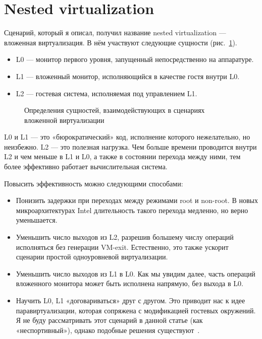 \section{Nested virtualization}
Сценарий, который я описал, получил название nested virtualization — вложенная виртуализация. В нём участвуют следующие сущности (рис.~\ref{fig:nested-virt}).
\begin{itemize}
\item L0 — монитор первого уровня, запущенный непосредственно на аппаратуре.
\item L1 — вложенный монитор, исполняющийся в качестве гостя внутри L0.
\item L2 — гостевая система, исполняемая под управлением L1.
\end{itemize}

\begin{figure}[htb]
    \centering
    \caption[Сценарий вложенной виртуализации]{Определения сущностей, взаимодействующих в сценариях вложенной виртуализации}
    \label{fig:nested-virt}
\end{figure}

L0 и L1 — это «бюрократический» код, исполнение которого нежелательно, но неизбежно. L2 — это полезная нагрузка. Чем больше времени проводится внутри L2 и чем меньше в L1 и L0, а также в состоянии перехода между ними, тем более эффективно работает вычислительная система.

Повысить эффективность можно следующими способами:
\begin{itemize}
\item Понизить задержки при переходах между режимами root и non-root. В новых микроархитектурах Intel длительность такого перехода медленно, но верно уменьшается.
\item Уменьшить число выходов из L2, разрешив большему числу операций исполняться без генерации VM-exit. Естественно, это также ускорит сценарии простой одноуровневой виртуализации.
\item Уменьшить число выходов из L1 в L0. Как мы увидим далее, часть операций вложенного монитора может быть исполнена напрямую, без выхода в L0.
\item Научить L0, L1 «договариваться» друг с другом. Это приводит нас к идее паравиртуализации, которая сопряжена с модификацией гостевых окружений. Я не буду рассматривать этот сценарий в данной статье (как «неспортивный»), однако подобные решения существуют .
\end{itemize}

